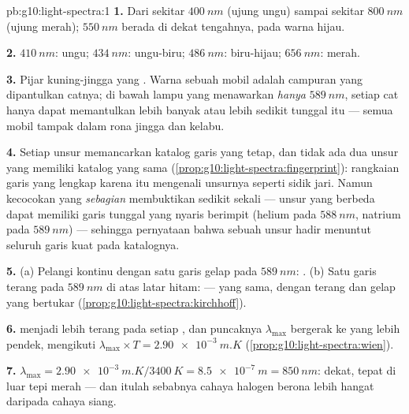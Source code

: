 \begin{solution}{pb:g10:light-spectra:1}
\textbf{1.} Dari sekitar $\qty{400}{nm}$ (ujung ungu) sampai sekitar
$\qty{800}{nm}$ (ujung merah); $\qty{550}{nm}$ berada di dekat
tengahnya, pada warna hijau.

\textbf{2.} $\qty{410}{nm}$: ungu; $\qty{434}{nm}$: ungu-biru;
$\qty{486}{nm}$: biru-hijau; $\qty{656}{nm}$: merah.

\textbf{3.} Pijar kuning-jingga yang . Warna sebuah mobil
adalah campuran  yang dipantulkan catnya; di bawah
lampu yang menawarkan \emph{hanya} $\qty{589}{nm}$, setiap cat hanya
dapat memantulkan lebih banyak atau lebih sedikit 
tunggal itu --- semua mobil tampak dalam rona jingga dan kelabu.

\textbf{4.} Setiap unsur memancarkan katalog garis yang tetap, dan
tidak ada dua unsur yang memiliki katalog yang sama
(\cref{prop:g10:light-spectra:fingerprint}): rangkaian garis yang
lengkap karena itu mengenali unsurnya seperti sidik jari. Namun
kecocokan yang \emph{sebagian} membuktikan sedikit sekali --- unsur
yang berbeda dapat memiliki garis tunggal yang nyaris berimpit (helium
pada $\qty{588}{nm}$, natrium pada $\qty{589}{nm}$) --- sehingga
pernyataan bahwa sebuah unsur hadir menuntut seluruh garis kuat pada
katalognya.

\textbf{5.} (a) Pelangi kontinu dengan satu garis gelap pada
$\qty{589}{nm}$: . (b) Satu garis terang pada
$\qty{589}{nm}$ di atas latar hitam:  ---  yang sama, dengan terang dan gelap yang bertukar
(\cref{prop:g10:light-spectra:kirchhoff}).

\textbf{6.}  menjadi lebih terang pada setiap , dan puncaknya $\lambda_{\max}$ bergerak ke 
yang lebih pendek, mengikuti
$\lambda_{\max} \times T = \qty{2.90e-3}{m.K}$
(\cref{prop:g10:light-spectra:wien}).

\textbf{7.} $\lambda_{\max} = \qty{2.90e-3}{m.K} / \qty{3400}{K}
= \qty{8.5e-7}{m} = \qty{850}{nm}$:  dekat, tepat di luar
tepi merah --- dan itulah sebabnya cahaya halogen berona lebih hangat
daripada cahaya siang.


\end{solution}
